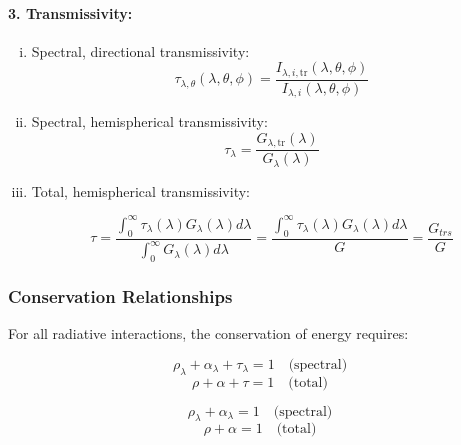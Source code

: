\paragraph{3. Transmissivity:}

\begin{enumerate}[(i)]
    \item Spectral, directional transmissivity:
    \[
    \tau_{\lambda,\theta}(\lambda,\theta,\phi) = \frac{I_{\lambda,i,\text{tr}}(\lambda,\theta,\phi)}{I_{\lambda,i}(\lambda,\theta,\phi)}
    \]
    
    \item Spectral, hemispherical transmissivity:
    \[
    \tau_{\lambda} = \frac{G_{\lambda,\text{tr}}(\lambda)}{G_{\lambda}(\lambda)}
    \]
    \item Total, hemispherical transmissivity:
    \textbf{}
    \begin{definition}    
    \[
    \tau = \frac{\displaystyle\int_0^{\infty} \tau_\lambda(\lambda) G_\lambda(\lambda) d \lambda}{\displaystyle\int_0^{\infty} G_\lambda(\lambda) d \lambda} = \frac{\displaystyle\int_0^{\infty} \tau_\lambda(\lambda) G_\lambda(\lambda) d \lambda}{G} = \frac{G_{trs}}{G}
    \]
    \end{definition}
\end{enumerate}
\subsubsection*{Conservation Relationships}
For all radiative interactions, the conservation of energy requires:

\begin{definition}
\[
\rho_{\lambda} + \alpha_{\lambda} + \tau_{\lambda} = 1 \quad \text{(spectral)}
\]
\[
\rho + \alpha + \tau = 1 \quad \text{(total)}
\]
\end{definition}

%
\begin{definition}
\[
\rho_{\lambda} + \alpha_{\lambda} = 1 \quad \text{(spectral)}
\]
\[
\rho + \alpha = 1 \quad \text{(total)}
\]
\end{definition}


